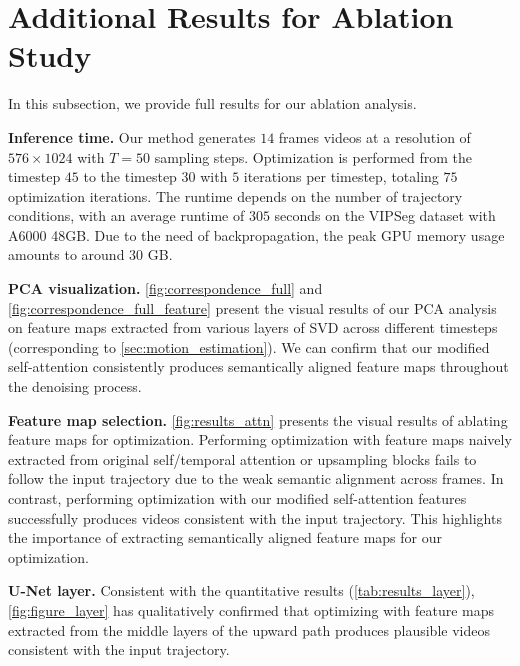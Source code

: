 \documentclass{article} \usepackage{iclr2025_conference,times}
\begin{document}
\section{Additional Results for Ablation Study}
In this subsection, we provide full results for our ablation analysis.

\textbf{Inference time.} Our method generates $14$ frames videos at a resolution of $576 \times 1024$ with $T=50$ sampling steps. Optimization is performed from the timestep $45$ to the timestep $30$ with $5$ iterations per timestep, totaling $75$ optimization iterations. The runtime depends on the number of trajectory conditions, with an average runtime of $305$ seconds on the VIPSeg dataset with A6000 48GB. Due to the need of backpropagation, the peak GPU memory usage amounts to around $30$ GB.

\textbf{PCA visualization.} \cref{fig:correspondence_full} and \cref{fig:correspondence_full_feature} present the visual results of our PCA analysis on feature maps extracted from various layers of SVD across different timesteps (corresponding to \cref{sec:motion_estimation}). 
We can confirm that our modified self-attention consistently produces semantically aligned feature maps throughout the denoising process.

\textbf{Feature map selection.} \cref{fig:results_attn} presents the visual results of ablating feature maps for optimization. 
Performing optimization with feature maps naively extracted from original self/temporal attention or upsampling blocks fails to follow the input trajectory due to the weak semantic alignment across frames. 
In contrast, performing optimization with our modified self-attention features successfully produces videos consistent with the input trajectory.
This highlights the importance of extracting semantically aligned feature maps for our optimization. 

\textbf{U-Net layer.} 
Consistent with the quantitative results 
(\cref{tab:results_layer}), \cref{fig:figure_layer} has qualitatively confirmed that optimizing with feature maps extracted from the middle layers of the upward path produces plausible videos consistent with the input trajectory.
\end{document}
